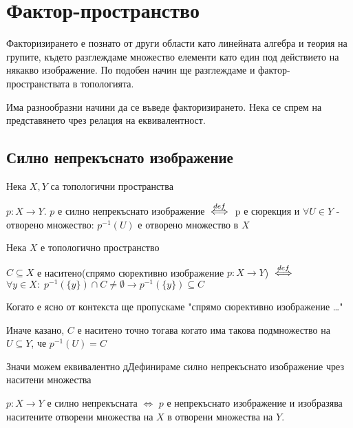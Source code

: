 \section{Фактор-пространство}
Факторизирането е познато от други области като линейната алгебра и теория на групите, където разглеждаме множество елементи като един под действието на някакво изображение. По подобен начин ще разглеждаме и фактор-пространствата в топологията.

Има разнообразни начини да се въведе факторизирането. Нека се спрем на представянето чрез релация на еквивалентност.

\subsection{Силно непрекъснато изображение}
\begin{definition}
    Нека $X, Y$ са топологични пространства
    
    $p: X \to Y$. $p$ е силно непрекъснато изображение ${\overset{def}{\iff}}$ p е сюрекция и $\forall U \in Y$ - отворено множество: $p^{-1}(U)$ е отворено множество в $X$
\end{definition}
\begin{definition}
    Нека $X$ е топологично пространство
    
    $C \subseteq X$ е наситено(спрямо сюрективно изображение $p: X\to Y$) ${\overset{def}{\iff}}$ $\forall y \in X:\; p^{-1}(\{y\}) \cap C \neq \emptyset \rightarrow p^{-1}(\{y\}) \subseteq C$  
\end{definition}
\begin{notation}
    Когато е ясно от контекста ще пропускаме "спрямо сюрективно изображение \dots"
\end{notation}
Иначе казано, $C$ е наситено точно тогава когато има такова подмножество на $U \subseteq Y$, че $p^{-1}(U) = C$

Значи можем еквивалентно дДефинираме силно непрекъснато изображение чрез наситени множества
\begin{proposition}
    $p: X \to Y$ е силно непрекъсната $\iff$ $p$ е непрекъснато изображение и изобразява наситените отворени множества на $X$ в отворени множества на $Y$.
\end{proposition}

